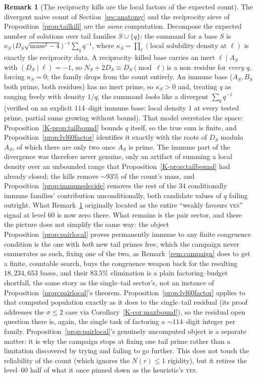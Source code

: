 \documentclass[11pt]{article}
\theoremstyle{definition}
\newtheorem{remark}[theorem]{Remark}
\begin{document}
\begin{remark}[The reciprocity kills are the local factors of the expected count]\label{rem:killcount}
The divergent naive count of Section~\ref{sec:anatomy} and the reciprocity sieve of
Proposition~\ref{prop:tailkill} are the \emph{same} computation. Decompose the expected number of
solutions over tail families $S\cup\{q\}$: the summand for a base $S$ is
$\kappa_S\,\bigl(D_S\sqrt{\mathrm{mass}^2-4}\bigr)^{-1}\sum_q q^{-1}$, where
$\kappa_S=\prod_\ell(\text{local solubility density at }\ell)$ is exactly the reciprocity data.
A reciprocity--killed base carries an inert $\ell\mid A_S$ with $(D_S\mid\ell)=-1$, so
$N_S+2D_S\equiv D_S\pmod\ell$ is a non--residue for \emph{every} $q$, forcing $\kappa_S=0$; the
family drops from the count entirely. An immune base ($A_S,B_S$ both prime, both residues) has no
inert prime, so $\kappa_S>0$ and, treating $q$ as ranging freely with density $1/q$, the summand
\emph{looks} like a divergent $\sum_q q^{-1}$ (verified on an explicit $114$--digit immune base: local
density $1$ at every tested prime, partial sums growing without bound). That model overstates the
space: Proposition~\ref{K-prop:tailbound} bounds $q$ itself, so the true sum is finite, and
Proposition~\ref{prop:lvl60factor} identifies it exactly with the roots of $D_S$ modulo $A_S$, of which
there are only two once $A_S$ is prime. The immune part of the divergence was therefore never genuine,
only an artifact of summing a local density over an unbounded range that
Proposition~\ref{K-prop:tailbound} had already closed; the kills remove ${\sim}93\%$ of the count's mass,
and Proposition~\ref{prop:immunedecide} removes the rest of the $34$ conditionally immune families'
contribution unconditionally, both candidate values of $q$ failing outright. What
Remark~\ref{rem:killcount} originally located as the entire ``weakly favours \textsc{yes}'' signal at
level $60$ is now zero there. What remains is the pair sector, and there the picture does not simplify
the same way: the object Proposition~\ref{prop:pairlocal} proves permanently immune to any finite
congruence condition is the one with \emph{both} new tail primes free, which the campaign never
enumerates as such, fixing one of the two, as Remark~\ref{rem:campaign} does to get a finite, countable
search, buys the congruence weapon back for the resulting $18{,}234{,}653$ bases, and their $83.5\%$
elimination is a plain factoring--budget shortfall, the same story as the single--tail sector's, not an
instance of Proposition~\ref{prop:pairlocal}'s theorem. Proposition~\ref{prop:lvl60factor} applies to
that computed population exactly as it does to the single--tail residual (its proof addresses the
$\sigma\le2$ case via Corollary~\ref{K-cor:maxbound}), so the residual open question there is, again, the
single task of factoring a $\sim\!114$--digit integer per family. Proposition~\ref{prop:pairlocal}'s
genuinely uncomputed object is a separate matter: it is why the campaign stops at fixing one tail prime
rather than a limitation discovered by trying and failing to go further. This does not touch the
reliability of the count (which ignores the $N(r)\le1$ rigidity), but it retires the level--$60$
half of what it once pinned down as the heuristic's \textsc{yes}.
\end{remark}
\end{document}

